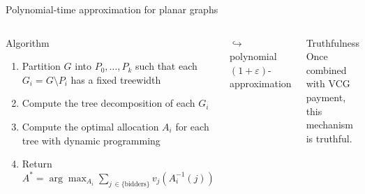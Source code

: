 \documentclass[aspectratio=169]{beamer}
\begin{document}
\begin{frame}{Polynomial-time approximation for planar graphs}
    \begin{columns}
        \begin{block}{Algorithm}
            \begin{enumerate}
                \item \alert{Partition} $G$ into $P_0, \dots, P_k$ such that each $G_i = G \setminus P_i$ has a \alert{fixed treewidth}
                \item Compute the \alert{tree decomposition} of each $G_i$
                \item Compute the optimal allocation $A_i$ for each tree with \alert{dynamic programming}
                \item Return $A^* = \arg \max_{A_i} \sum_{j \,\in \{\text{bidders}\}} v_j(A_i^{-1}(j))$
            \end{enumerate}
        \end{block}

        $\hookrightarrow$ polynomial \alert{$(1 + \varepsilon)$-approximation}

        \begin{block}{Truthfulness}
            Once combined with \alert{VCG payment}, this mechanism is \alert{truthful}.
        \end{block}

        \begin{figure}[H]
            \centering
            \includegraphics[width=0.9\textwidth]{img/treewidth.pdf}
        \end{figure}
    \end{columns}
\end{frame}
\end{document}
